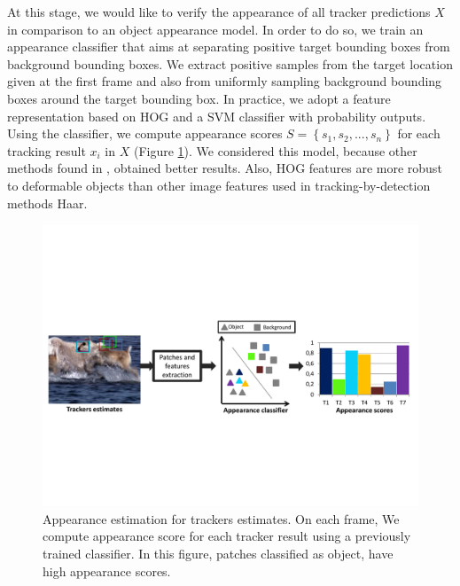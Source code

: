 At this stage, we would like to verify the appearance of all tracker
predictions $X$ in comparison to an object appearance model.
In order to do so, we train an appearance classifier that aims at separating
positive target bounding boxes from background bounding boxes.
We extract positive samples from the target location given at the first frame
and also from uniformly sampling background bounding boxes around the target
bounding box.
In practice, we adopt a feature representation based on HOG and a SVM
classifier with probability outputs.
Using the classifier, we compute appearance scores  
$S = \left \{ s_1, s_2, ..., s_n \right \}$ for each tracking result $x_i$ in
$X$ (Figure \ref{fig::svm_app}). We considered this model, because other methods found in 
\cite{zhang2014meem,Bai2013}, obtained better results. Also, HOG features are
more robust to deformable objects than other image features used in
tracking-by-detection methods \eg Haar.

\begin{figure}[b!]
\centering
\includegraphics[page=1, width=1\linewidth, trim= 0.2cm 6cm 0.2cm 6.5cm,
                 clip=true]{Figures/figures_mod}
\caption[Appearance estimation for trackers estimates.]
        {\small Appearance estimation for trackers estimates. On each frame,
        We compute appearance score for each tracker result using a previously
        trained classifier. In this figure, patches classified as object, have high
        appearance scores.}
\label{fig::svm_app}
\end{figure}


